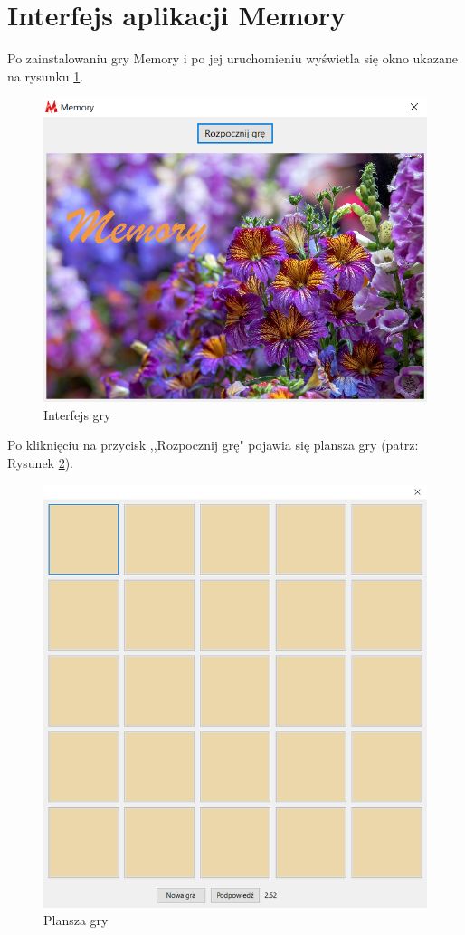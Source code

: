 \documentclass[a4paper]{article}
\begin{document}
\section{Interfejs aplikacji Memory}
Po zainstalowaniu gry Memory i po jej uruchomieniu wyświetla się okno ukazane na rysunku \ref{fig:interf}. 
\noindent
\begin{figure}[H]
    \centering
    \includegraphics{interfejs.PNG}
    \caption{Interfejs gry}
    \label{fig:interf}
\end{figure}
 Po kliknięciu na przycisk ,,Rozpocznij grę" pojawia się plansza gry (patrz: Rysunek \ref{fig:plansza}).
\begin{figure}[H]
    \centering
    \includegraphics{plansza.PNG}
    \caption{Plansza gry}
    \label{fig:plansza}
\end{figure}
\end{document}
